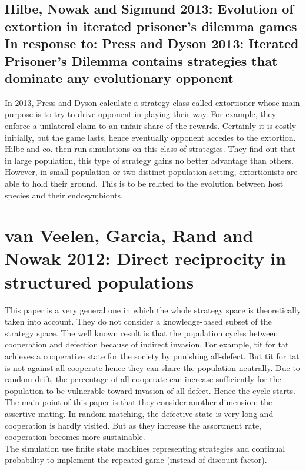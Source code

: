 \documentclass[12.5pt]{report}
\begin{document}
\subsection{Hilbe, Nowak and Sigmund 2013: Evolution of extortion in iterated prisoner’s dilemma games\\
In response to: Press and Dyson 2013: Iterated Prisoner’s Dilemma contains strategies that dominate any evolutionary opponent}

In 2013, Press and Dyson calculate a strategy class called extortioner whose main purpose is to try to drive opponent in playing their way. For example, they enforce a unilateral claim to an unfair share of the rewards. Certainly it is costly initially, but the game lasts, hence eventually opponent accedes to the extortion.\\

Hilbe and co. then run simulations on this class of strategies. They find out that in large population, this type of strategy gains no better advantage than others. However, in small population or two distinct population setting, extortionists are able to hold their ground. This is to be related to the evolution between host species and their endosymbionts.

\section{van Veelen, Garcia, Rand and Nowak 2012: Direct reciprocity in structured populations}
This paper is a very general one in which the whole strategy space is theoretically taken into account. They do not consider a knowledge-based subset of the strategy space. The well known result is that the population cycles between cooperation and defection because of indirect invasion. For example, tit for tat achieves a cooperative state for the society by punishing all-defect. But tit for tat is not against all-cooperate hence they can share the population neutrally. Due to random drift, the percentage of all-cooperate can increase sufficiently for the population to be vulnerable toward invasion of all-defect. Hence the cycle starts. 
The main point of this paper is that they consider another dimension: the assertive mating. In random matching, the defective state is very long and cooperation is hardly visited. But as they increase the assortment rate, cooperation becomes more sustainable.\\

The simulation use finite state machines representing strategies and continual probability to implement the repeated game (instead of discount factor).
\end{document}
